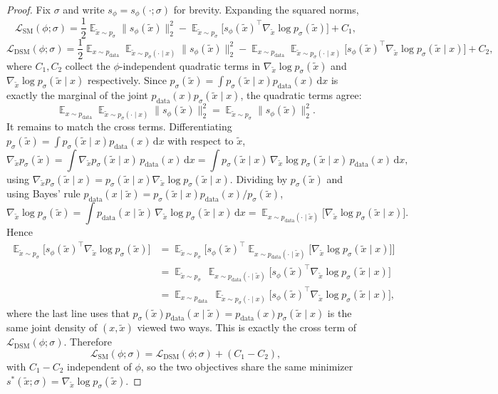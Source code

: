 \documentclass[11pt,a4paper]{article}
\newcommand{\wt}{\widetilde}
\renewcommand{\tilde}{\wt}
\renewcommand{\d}{\mathrm{d}}
\DeclareMathOperator*{\E}{\mathbb{E}}
\newcommand{\pdata}{p_{\mathrm{data}}}
\newcommand{\psigma}{p_{\sigma}}
\begin{document}
\begin{proof}
Fix $\sigma$ and write $s_{\phi}=s_{\phi}(\cdot;\sigma)$ for brevity. Expanding the squared norms,
\[
\mathcal{L}_{\mathrm{SM}}(\phi;\sigma)
=\frac12\E_{\tilde x\sim\psigma}\|s_{\phi}(\tilde x)\|_2^2
-\E_{\tilde x\sim\psigma}\big[s_{\phi}(\tilde x)^\top \nabla_{\tilde x}\log\psigma(\tilde x)\big]+C_1,
\]
\[
\mathcal{L}_{\mathrm{DSM}}(\phi;\sigma)
=\frac12\E_{x\sim\pdata}\E_{\tilde x\sim\psigma(\cdot\mid x)}\|s_{\phi}(\tilde x)\|_2^2
-\E_{x\sim\pdata}\E_{\tilde x\sim\psigma(\cdot\mid x)}\big[s_{\phi}(\tilde x)^\top \nabla_{\tilde x}\log\psigma(\tilde x\mid x)\big]+C_2,
\]
where $C_1,C_2$ collect the $\phi$-independent quadratic terms in $\nabla_{\tilde x}\log\psigma(\tilde x)$ and $\nabla_{\tilde x}\log\psigma(\tilde x\mid x)$ respectively. Since $\psigma(\tilde x)=\int\psigma(\tilde x\mid x)\pdata(x)\,\d x$ is exactly the marginal of the joint $\pdata(x)\psigma(\tilde x\mid x)$, the quadratic terms agree:
\[
\E_{x\sim\pdata}\E_{\tilde x\sim\psigma(\cdot\mid x)}\|s_{\phi}(\tilde x)\|_2^2
=\E_{\tilde x\sim\psigma}\|s_{\phi}(\tilde x)\|_2^2.
\]
It remains to match the cross terms. Differentiating $\psigma(\tilde x)=\int\psigma(\tilde x\mid x)\pdata(x)\,\d x$ with respect to $\tilde x$,
\[
\nabla_{\tilde x}\psigma(\tilde x)
=\int \nabla_{\tilde x}\psigma(\tilde x\mid x)\,\pdata(x)\,\d x
=\int \psigma(\tilde x\mid x)\,\nabla_{\tilde x}\log\psigma(\tilde x\mid x)\,\pdata(x)\,\d x,
\]
using $\nabla_{\tilde x}\psigma(\tilde x\mid x)=\psigma(\tilde x\mid x)\nabla_{\tilde x}\log\psigma(\tilde x\mid x)$. Dividing by $\psigma(\tilde x)$ and using Bayes' rule $\pdata(x\mid\tilde x)=\psigma(\tilde x\mid x)\pdata(x)/\psigma(\tilde x)$,
\[
\nabla_{\tilde x}\log\psigma(\tilde x)
=\int \pdata(x\mid\tilde x)\,\nabla_{\tilde x}\log\psigma(\tilde x\mid x)\,\d x
=\E_{x\sim\pdata(\cdot\mid\tilde x)}\big[\nabla_{\tilde x}\log\psigma(\tilde x\mid x)\big].
\]
Hence
\begin{align*}
\E_{\tilde x\sim\psigma}\big[s_{\phi}(\tilde x)^\top \nabla_{\tilde x}\log\psigma(\tilde x)\big]
&=\E_{\tilde x\sim\psigma}\Big[s_{\phi}(\tilde x)^\top \E_{x\sim\pdata(\cdot\mid\tilde x)}\big[\nabla_{\tilde x}\log\psigma(\tilde x\mid x)\big]\Big] \\
&=\E_{\tilde x\sim\psigma}\,\E_{x\sim\pdata(\cdot\mid\tilde x)}\big[s_{\phi}(\tilde x)^\top \nabla_{\tilde x}\log\psigma(\tilde x\mid x)\big] \\
&=\E_{x\sim\pdata}\,\E_{\tilde x\sim\psigma(\cdot\mid x)}\big[s_{\phi}(\tilde x)^\top \nabla_{\tilde x}\log\psigma(\tilde x\mid x)\big],
\end{align*}
where the last line uses that $\psigma(\tilde x)\pdata(x\mid\tilde x)=\pdata(x)\psigma(\tilde x\mid x)$ is the same joint density of $(x,\tilde x)$ viewed two ways. This is exactly the cross term of $\mathcal{L}_{\mathrm{DSM}}(\phi;\sigma)$. Therefore
\[
\mathcal{L}_{\mathrm{SM}}(\phi;\sigma)=\mathcal{L}_{\mathrm{DSM}}(\phi;\sigma)+(C_1-C_2),
\]
with $C_1-C_2$ independent of $\phi$, so the two objectives share the same minimizer $s^*(\tilde x;\sigma)=\nabla_{\tilde x}\log\psigma(\tilde x)$.
\end{proof}
\end{document}
